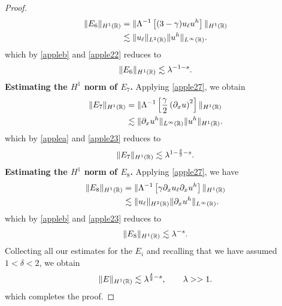 \begin{proof}
\begin{equation}
\begin{split}
		\|E_6\|_{H^1(\mathbb{R})} 
		& = \|\Lambda^{-1} \left[ (3 -\gamma) u_\ell u^h \right]\|_{H^1(\mathbb{R})}
		\\
		& \lesssim \|u_\ell\|_{L^2(\mathbb{R})} \|u^h\|_{L^\infty(\mathbb{R})}.
		\label{apple30}
	\end{split}
\end{equation}
which by  \cref{appleb} and \eqref{apple22} reduces to
\begin{equation}
	\begin{split}
		\|E_6\|_{H^1(\mathbb{R})} \lesssim \lambda^{-1-s}.
		\label{apple31}
	\end{split}
\end{equation}
%
%
%
%
%
{\bf Estimating the $H^1$ norm of $\hyperref[all_errors_together]{E_7}$.} Applying \eqref{apple27}, we obtain
\begin{equation}
	\begin{split}
		\|E_7\|_{H^1(\mathbb{R})} 
		& = \|\Lambda^{-1} \left[ \frac{\gamma}{2}\left( \partial_x u \right)^2
		\right]\|_{H^1(\mathbb{R})}
		\\
		& \lesssim  \|\partial_x u^h\|_{L^\infty(\mathbb{R})} \|u^h\|_{H^1(\mathbb{R})}.
		\label{apple32}
	\end{split}
\end{equation}
which by  \cref{applea} and \eqref{apple23} reduces to
\begin{equation}
	\begin{split}
		\|E_7\|_{H^1(\mathbb{R})} \lesssim \lambda^{1-\frac{\delta}{2}-s}.
		\label{apple33'}
	\end{split}
\end{equation}
%
%
%
%
%
{\bf Estimating the $H^1$ norm of $\hyperref[all_errors_together]{E_8}$.} Applying \eqref{apple27}, we have
\begin{equation}
	\begin{split}
		\|E_8\|_{H^1(\mathbb{R})}
		& = \|\Lambda^{-1}\left[ \gamma \partial_x u_\ell \partial_x u^h \right]\|_{H^1(\mathbb{R})}
		\\
		& \lesssim \|u_\ell\|_{H^2(\mathbb{R})} \|\partial_x u^h\|_{L^\infty(\mathbb{R})}.
		\label{apple33}
	\end{split}
\end{equation}
which by  \cref{appleb} and \eqref{apple23} reduces to
\begin{equation}
	\begin{split}
		\|E_8\|_{H^1(\mathbb{R})} \lesssim \lambda^{-s}.
		\label{apple34}
	\end{split}
\end{equation}
Collecting all our estimates for the $E_i$ and recalling that we have assumed
$1<\delta<2$, we obtain
\begin{equation*}
	\begin{split}
		\|E\|_{H^1(\mathbb{R})}
		 \lesssim \lambda^{\frac{\delta}{2} -s }, \qquad \lambda >>1.
	\end{split}
\end{equation*}
which completes the proof.
\end{proof}
%
%
%
%
%

